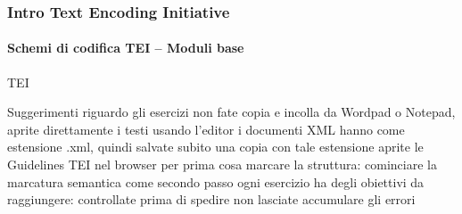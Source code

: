 \begin{frame}
	\frametitle{Intro Text Encoding Initiative}
	\framesubtitle{Schemi di codifica TEI – Moduli base}
	\addtocounter{nframe}{1}

	\begin{block}{TEI}
        
        Suggerimenti riguardo gli esercizi
        non fate copia e incolla da Wordpad o Notepad, aprite
        direttamente i testi usando l'editor
        i documenti XML hanno come estensione .xml, quindi
        salvate subito una copia con tale estensione
        aprite le Guidelines TEI nel browser
        per prima cosa marcare la struttura: cominciare la
        marcatura semantica come secondo passo
        ogni esercizio ha degli obiettivi da raggiungere:
        controllate prima di spedire
        non lasciate accumulare gli errori
    \end{block}
    
   

\end{frame}